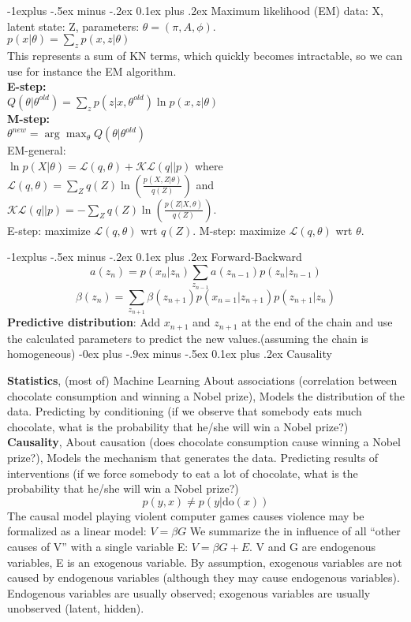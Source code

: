 \documentclass[9pt,landscape]{article}
\makeatletter
\renewcommand{\section}{\@startsection{section}{1}{0mm}%
                                {-0ex plus -.9ex minus -.5ex}%
                                {0.1ex plus .2ex}%
                                {\normalfont\scriptsize\bfseries}}
\renewcommand{\subsubsection}{\@startsection{subsection}{2}{0mm}%
                                {-1explus -.5ex minus -.2ex}%
                                {0.1ex plus .2ex}%
                                {\normalfont\scriptsize\bfseries}}
\makeatother
\begin{document}
\begin{multicols}{3}
\subsubsection{Maximum likelihood (EM)}
\vspace{-.4em}
data: X, latent state: Z, parameters: $\theta = (\pi, A, \phi)$.\\
$p(x|\theta) = \sum_z p (x,z|\theta)$\\
This represents a sum of KN terms, which quickly becomes intractable, so we can use
for instance the EM algorithm.\\
\textbf{E-step:}\\
$Q(\theta|\theta^{old}) = \sum_z p (z|x,\theta^{old})\ln p (x,z|\theta)$\\
\textbf{M-step:}\\
$\theta^{new} = \arg\max_{\theta}Q(\theta|\theta^{old})$\\
EM-general:\\
$\ln p(X|\theta) = \mathcal{L}(q, \theta) + \mathcal{KL}(q||p)$ where
$\mathcal{L}(q, \theta) = \sum_Z q(Z) \ln(\frac{p(X, Z| \theta)}{ q(Z)})$ and
$\mathcal{KL}(q||p) = -\sum_Z q(Z) \ln(\frac{p(Z| X, \theta)}{q(Z)})$.\\
E-step: maximize $\mathcal{L}(q, \theta)$ wrt $q(Z)$. M-step: maximize $\mathcal{L}(q, \theta)$ wrt $\theta$.

\subsubsection{Forward-Backward}
$$a(z_n) = p(x_n|z_n) \sum_{z_{n-1}} a(z_{n-1})p(z_n|z_{n-1})$$
$$\beta(z_n) = \sum_{z_{n+1}} \beta(z_{n+1}) p(x_{n=1}|z_{n+1})p(z_{n+1}|z_n)$$
\textbf{Predictive distribution}: Add $x_{n+1}$ and $z_{n+1}$ at the end of the chain and use the calculated parameters to predict the new values.(assuming the chain is homogeneous)
\section{Causality}
\begin{scriptsize}
\textbf{Statistics}, (most of) Machine Learning
About associations (correlation between chocolate consumption and
winning a Nobel prize), Models the distribution of the data. Predicting by conditioning (if we observe that somebody eats much
chocolate, what is the probability that he/she will win a Nobel prize?)
\textbf{Causality}, About causation (does chocolate consumption cause winning a Nobel
prize?), Models the mechanism that generates the data. Predicting results of interventions (if we force somebody to eat a lot
of chocolate, what is the probability that he/she will win a Nobel
prize?)
$$p(y,x) \neq p(y|\mathrm{do}(x))$$
The causal model playing violent computer games causes violence
may be formalized as a linear model:
$V = \beta G$
We summarize the in
influence of all ``other causes of V'' with a single variable E: $V = \beta G +E$. V and G are endogenous variables, E is an exogenous variable.
By assumption, exogenous variables are not caused by endogenous
variables (although they may cause endogenous variables).
Endogenous variables are usually observed; exogenous variables are
usually unobserved (latent, hidden).
\end{scriptsize}

\end{multicols}
\end{document}
